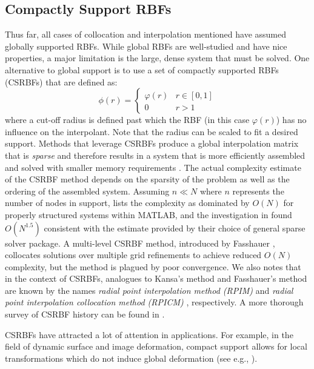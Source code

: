 \documentclass[11pt]{report}
\begin{document}
{


\subsection{Compactly Support RBFs} 

Thus far, all cases of collocation and interpolation mentioned have assumed globally supported RBFs. While global RBFs are well-studied and have nice properties, a major limitation is the large, dense system that must be solved. One alternative to global support is to use a set of compactly supported RBFs (CSRBFs) that are defined as: 
\begin{equation}
\phi(r) = \begin{cases} \varphi(r) & r \in [0,1]\\
0 & r > 1
\end{cases}
\label{eqn:csrbf}
\end{equation}
where a cut-off radius is defined past which the RBF (in this case $\varphi(r)$) has no influence on the interpolant. Note that the radius can be scaled to fit a desired support. Methods that leverage CSRBFs produce a global interpolation matrix that is \emph{sparse} and therefore results in a system that is more efficiently assembled and solved with smaller memory requirements \cite{Fasshauer2007}. The actual complexity estimate of the CSRBF method depends on the sparsity of the problem as well as the ordering of the assembled system. Assuming $n \ll N$ where $n$ represents the number of nodes in support, \cite{Zhang2004} lists the complexity as dominated by $O(N)$ for properly structured systems within MATLAB, and the investigation in \cite{Morse2005} found $O(N^{1.5})$ consistent with the estimate provided by their choice of general sparse solver package. A multi-level CSRBF method, introduced by Fasshauer \cite{Fasshauer2007}, collocates solutions over multiple grid refinements to achieve reduced $O(N)$ complexity, but the method is plagued by poor convergence. We also notes that in the context of CSRBFs, analogues to Kansa's method and Fasshauer's method are known by the names \emph{radial point interpolation method (RPIM)} \cite{Wang2002} and \emph{radial point interpolation collocation method (RPICM)} \cite{Liu2005}, respectively. A more thorough survey of CSRBF history can be found in \cite{Fasshauer2007,Iske2004}.

CSRBFs have attracted a lot of attention in applications. For example, in the field of dynamic surface and image deformation, compact support allows for local transformations which do not induce global deformation (see e.g., \cite{Yang2008, Lin2009, Correa2007}). 




}
\end{document}
